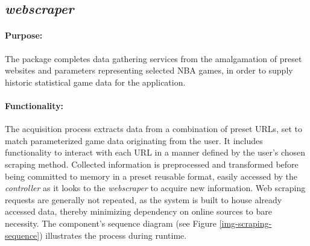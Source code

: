 \documentclass{thesis-ekf}
\theoremstyle{definition}
\theoremstyle{remark}
\begin{document}
{\subsection{\emph{webscraper}}
\paragraph{Purpose:}
The package completes data gathering services from the amalgamation of preset websites and parameters representing selected NBA games, in order to supply historic statistical game data for the application.
\paragraph{Functionality:}
The acquisition process extracts data from a combination of preset URLs, set to match parameterized game data originating from the user. It includes functionality to interact with each URL in a manner defined by the user's chosen scraping method. Collected information is preprocessed and transformed before being committed to memory in a preset reusable format, easily accessed by the \emph{controller} as it looks to the \emph{webscraper} to acquire new information. Web scraping requests are generally not repeated, as the system is built to house already accessed data, thereby minimizing dependency on online sources to bare necessity. The component's sequence diagram (see Figure \ref{img-scraping-sequence}) illustrates the process during runtime.
}
\end{document}
